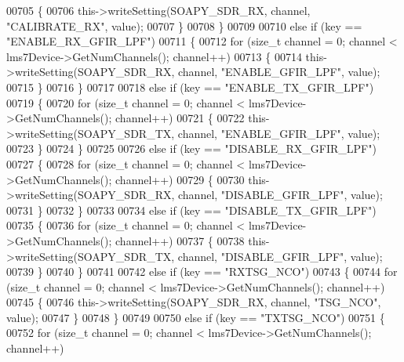 \begin{DoxyCode}
{{{{{{{{{{{{{{00705         \{
00706             this->writeSetting(SOAPY\_SDR\_RX, channel, \textcolor{stringliteral}{"CALIBRATE\_RX"}, value);
00707         \}
00708     \}
00709 
00710     \textcolor{keywordflow}{else} \textcolor{keywordflow}{if} (key == \textcolor{stringliteral}{"ENABLE\_RX\_GFIR\_LPF"})
00711     \{
00712         \textcolor{keywordflow}{for} (\textcolor{keywordtype}{size\_t} channel = 0; channel < lms7Device->GetNumChannels(); channel++)
00713         \{
00714             this->writeSetting(SOAPY\_SDR\_RX, channel, \textcolor{stringliteral}{"ENABLE\_GFIR\_LPF"}, value);
00715         \}
00716     \}
00717 
00718     \textcolor{keywordflow}{else} \textcolor{keywordflow}{if} (key == \textcolor{stringliteral}{"ENABLE\_TX\_GFIR\_LPF"})
00719     \{
00720         \textcolor{keywordflow}{for} (\textcolor{keywordtype}{size\_t} channel = 0; channel < lms7Device->GetNumChannels(); channel++)
00721         \{
00722             this->writeSetting(SOAPY\_SDR\_TX, channel, \textcolor{stringliteral}{"ENABLE\_GFIR\_LPF"}, value);
00723         \}
00724     \}
00725 
00726     \textcolor{keywordflow}{else} \textcolor{keywordflow}{if} (key == \textcolor{stringliteral}{"DISABLE\_RX\_GFIR\_LPF"})
00727     \{
00728         \textcolor{keywordflow}{for} (\textcolor{keywordtype}{size\_t} channel = 0; channel < lms7Device->GetNumChannels(); channel++)
00729         \{
00730             this->writeSetting(SOAPY\_SDR\_RX, channel, \textcolor{stringliteral}{"DISABLE\_GFIR\_LPF"}, value);
00731         \}
00732     \}
00733 
00734     \textcolor{keywordflow}{else} \textcolor{keywordflow}{if} (key == \textcolor{stringliteral}{"DISABLE\_TX\_GFIR\_LPF"})
00735     \{
00736         \textcolor{keywordflow}{for} (\textcolor{keywordtype}{size\_t} channel = 0; channel < lms7Device->GetNumChannels(); channel++)
00737         \{
00738             this->writeSetting(SOAPY\_SDR\_TX, channel, \textcolor{stringliteral}{"DISABLE\_GFIR\_LPF"}, value);
00739         \}
00740     \}
00741 
00742     \textcolor{keywordflow}{else} \textcolor{keywordflow}{if} (key == \textcolor{stringliteral}{"RXTSG\_NCO"})
00743     \{
00744         \textcolor{keywordflow}{for} (\textcolor{keywordtype}{size\_t} channel = 0; channel < lms7Device->GetNumChannels(); channel++)
00745         \{
00746             this->writeSetting(SOAPY\_SDR\_RX, channel, \textcolor{stringliteral}{"TSG\_NCO"}, value);
00747         \}
00748     \}
00749 
00750     \textcolor{keywordflow}{else} \textcolor{keywordflow}{if} (key == \textcolor{stringliteral}{"TXTSG\_NCO"})
00751     \{
00752         \textcolor{keywordflow}{for} (\textcolor{keywordtype}{size\_t} channel = 0; channel < lms7Device->GetNumChannels(); channel++)
}}}}}}}}}}}}}}
\end{DoxyCode}
